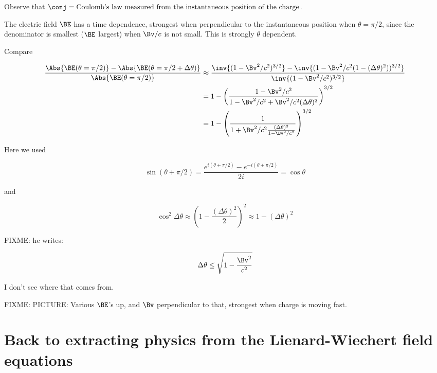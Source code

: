 Observe that $\conj = \text{Coulomb's law measured from the instantaneous position of the charge}$.

The electric field $\BE$ has a time dependence, strongest when perpendicular to the instantaneous position when $\theta = \pi/2$, since the denominator is smallest ($\BE$ largest) when $\Bv/c$ is not small.  This is strongly $\theta$ dependent.

Compare

\begin{align*}
\frac{\Abs{\BE(\theta = \pi/2)} - \Abs{\BE(\theta = \pi/2 + \Delta \theta)} }
{
\Abs{\BE(\theta = \pi/2)}
}
&\approx
\frac{
\inv{(1 - \Bv^2/c^2)^{3/2}}
 - \inv{(1 - \Bv^2/c^2(1 - (\Delta \theta)^2))^{3/2}}
}
{
\inv{(1 - \Bv^2/c^2)^{3/2}}
} \\
&=
1 - 
\left(
\frac{1 - \Bv^2/c^2}{
1 - \Bv^2/c^2 + \Bv^2/c^2(\Delta \theta)^2
}
\right)^{3/2} \\
&=
1 - 
\left(
\frac{1}{
1 + \Bv^2/c^2 \frac{(\Delta \theta)^2}{1 - \Bv^2/c^2}
}
\right)^{3/2} \\
\end{align*}

Here we used

\begin{equation}\label{eqn:relativisticElectrodynamicsL19:240}
\sin(\theta + \pi/2) = \frac{e^{i (\theta + \pi/2)} - e^{-i(\theta + \pi/2)}}{2i} = \cos\theta 
\end{equation}

and

\begin{equation}\label{eqn:relativisticElectrodynamicsL19:260}
\cos^2 \Delta \theta \approx \left( 1 - \frac{(\Delta \theta)^2}{2} \right)^2 \approx 1 - (\Delta \theta)^2
\end{equation}

FIXME: he writes:

\begin{equation}\label{eqn:relativisticElectrodynamicsL19:280}
\Delta \theta \le \sqrt{1 - \frac{\Bv^2}{c^2}}
\end{equation}

I don't see where that comes from.

FIXME: PICTURE: Various $\BE$'s up, and $\Bv$ perpendicular to that, strongest when charge is moving fast.

\section{Back to extracting physics from the Lienard-Wiechert field equations}

